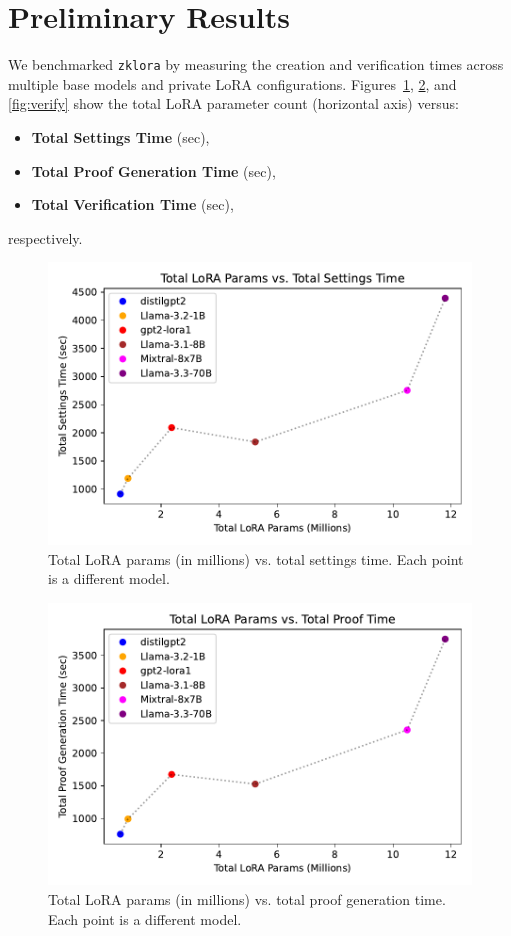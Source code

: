 \documentclass[11pt]{article}
\begin{document}
\section{Preliminary Results}

We benchmarked \texttt{zklora} by measuring the creation and verification times across multiple base models and private LoRA configurations. 
Figures~\ref{fig:settings}, \ref{fig:proof}, and \ref{fig:verify} show the total LoRA parameter count (horizontal axis) versus:
\begin{itemize}
    \item \textbf{Total Settings Time} (sec),
    \item \textbf{Total Proof Generation Time} (sec),
    \item \textbf{Total Verification Time} (sec),
\end{itemize}
respectively.

\begin{figure}[ht]
    \centering
    \includegraphics[width=0.55\linewidth]{figs/fig_settings.pdf}
    \caption{Total LoRA params (in millions) vs. total settings time. Each point is a different model.}
    \label{fig:settings}
\end{figure}

\begin{figure}[ht]
    \centering
    \includegraphics[width=0.55\linewidth]{figs/fig_proof.pdf}
    \caption{Total LoRA params (in millions) vs. total proof generation time. Each point is a different model.}
    \label{fig:proof}
\end{figure}
\end{document}
